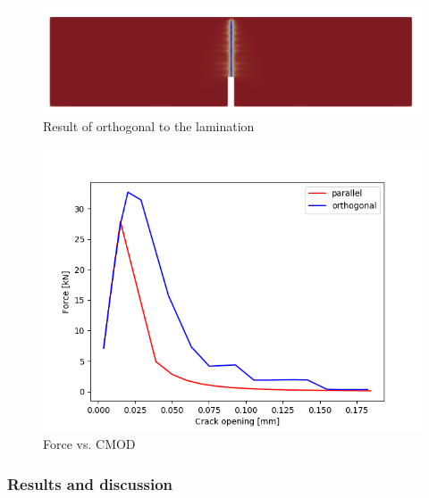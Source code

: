 \begin{figure}[!ht]
\centering
\includegraphics[width=1\textwidth]{figures/ME1_ext_2D_orth_result.png}
\caption{Result of orthogonal to the lamination}
\label{fig:ME1_ext_vpf_orth_result}
\end{figure}

\begin{figure}[!ht]
\centering
\includegraphics[width=1\textwidth]{figures/ME1_ext_NFvsCMOD.png}
\caption{Force vs. CMOD}
\label{fig:ME1_ext_vpf_FvsCMOD}
\end{figure}


\subsubsection{Results and discussion}


